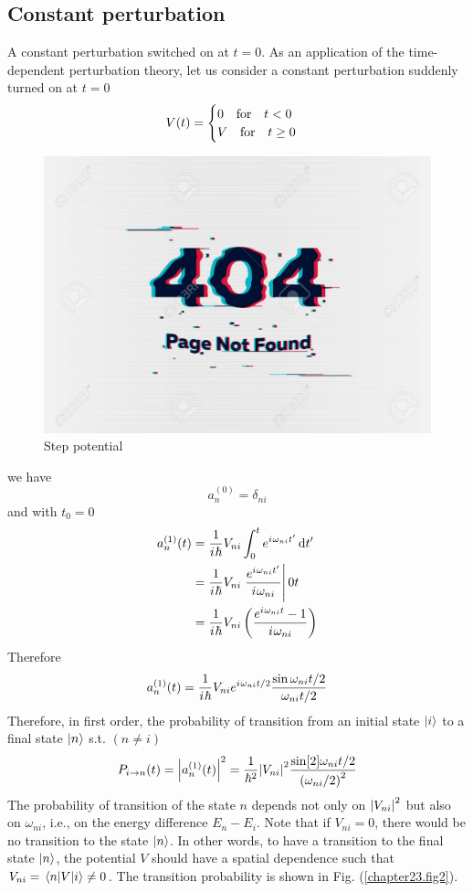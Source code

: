 \subsection{Constant perturbation}
A constant perturbation switched on at $t=0$. As an application of the time-dependent perturbation theory, let us consider a constant perturbation suddenly turned on at $t=0$
\begin{equation}
\label{chapter23.eqn26}
V(t) = \begin{cases}
0 \qq{for} t<0 \\
V \qq{for} t \geq 0
\end{cases}
\end{equation}
\begin{figure}
	\centering
	\includegraphics[width=0.5\linewidth]{Pictures/not-found.jpg}
	\caption{Step potential}
	\label{chapter23.fig1}
\end{figure}
we have
\begin{equation}
a_n^{(0)} = \delta_{n i}
\end{equation}
and with $t_0 = 0$
\begin{align*}
a_n^{(1)}(t) 
&= \frac{1}{\iu \hbar} V_{n i} \int_{0}^{t} e^{\iu \omega_{n i} t^\prime} \dd{t^\prime}\\
&= \frac{1}{\iu \hbar} V_{n i} \eval{\frac{e^{\iu \omega_{n i} t^\prime}}{\iu \omega_{n i}}}{0}{t} \\
&= \frac{1}{\iu \hbar} V_{n i} \left(\frac{e^{\iu \omega_{n i} t} - 1}{\iu \omega_{n i}}\right)
\end{align*}
Therefore
\begin{equation}
\label{chapter23.eqn27}
	a_n^{(1)}(t) = \frac{1}{{i\mkern1mu} \hbar} V_{n i} e^{{i\mkern1mu} \omega_{n i} t/2}\frac{\sin \omega_{n i} t/2}{\omega_{n i} t/2}
\end{equation}
Therefore, in first order, the probability of transition from an initial state $\ket{i}$ to a final state $\ket{n}$ s.t. $(n \neq i)$
\begin{align}
\label{chapter23.eqn28}
P_{i \rightarrow n}(t) = \abs{a_n^{(1)}(t)}^2 = \frac{1}{\hbar^2} \abs{V_{n i}}^2 \frac{\sin[2]{\omega_{n i}t/2}}{\qty(\omega_{n i}/2)^2}
\end{align}
The probability of transition of the state $n$ depends not only on $\abs{V_{n i}}^2$ but also on $\omega_{n i}$, i.e., on the energy difference $E_n - E_i$. Note that if $V_{n i} = 0$, there would be no transition to the state $\ket{n}$. In other words, to have a transition to the final state $\ket{n}$, the potential $V$ should have a spatial dependence such that $V_{n i} = \mel{n}{V}{i} \neq 0$. The transition probability is shown in Fig. (\ref{chapter23.fig2}).


